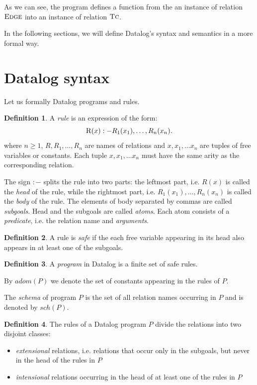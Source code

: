 \documentclass{pracamgr}
\theoremstyle{plain}
\theoremstyle{definition}
\newtheorem{defn}{Definition}[section]
\theoremstyle{remark}
\newcommand{\assign}{:-}
\begin{document}
As we can see, the program defines a function from the an instance of relation $\textsc{Edge}$ into an instance of relation $\textsc{Tc}$.

In the following sections, we will define Datalog's syntax and semantics in a more formal way.

\section{Datalog syntax}
Let us formally Datalog programs and rules.

\begin{defn}
A \emph{rule} is an expression of the form:
$$ \textsc{R}(x) \assign R_1(x_1), \dots, R_n(x_n). $$
where $n \ge 1$, $R, R_1, \dots, R_n$ are names of relations and $x, x_1, \dots x_n$ are tuples of free variables or constants. Each tuple $x, x_1, \dots x_n$ must have the same arity as the corresponding relation.
\end{defn}\label{d:datalogrule}

The sign $\assign$ splits the rule into two parts: the leftmost part, i.e. $R(x)$ is called the \emph{head} of the rule, while the rightmost part, i.e. $R_1(x_1), \dots, R_n(x_n)$ is called the \emph{body} of the rule. The elements of body separated by commas are called \emph{subgoals}. Head and the subgoals are called \emph{atoms}. Each atom consists of a \emph{predicate}, i.e. the relation name and \emph{arguments}.

\begin{defn}
A rule is \emph{safe} if the each free variable appearing in its head also appears in at least one of the subgoals.
\end{defn}\label{d:datalogsaferule}

\begin{defn}
A \emph{program} in Datalog is a finite set of safe rules.
\end{defn}\label{d:datalogprog}

By $adom(P)$ we denote the set of constants appearing in the rules of $P$.

The \emph{schema} of program $P$ is the set of all relation names occurring in $P$ and is denoted by $sch(P)$.

\begin{defn}
The rules of a Datalog program $P$ divide the relations into two disjoint classes: 
\begin{itemize}
\item \emph{extensional} relations, i.e. relations that occur only in the subgoals, but never in the head of the rules in $P$
\item \emph{intensional} relations occurring in the head of at least one of the rules in $P$
\end{itemize}
\end{defn}
\end{document}
